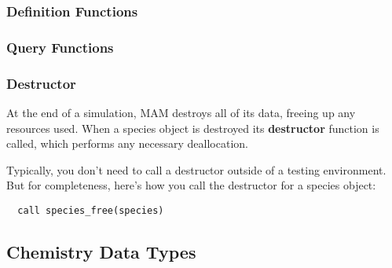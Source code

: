 \subsubsection*{Definition Functions}

\subsubsection*{Query Functions}

\subsubsection*{Destructor}

At the end of a simulation, MAM destroys all of its data, freeing up any
resources used. When a species object is destroyed its {\bf destructor }
function is called, which performs any necessary deallocation.

Typically, you don't need to call a destructor outside of a testing environment.
But for completeness, here's how you call the destructor for a species object:

\begin{verbatim}
  call species_free(species)
\end{verbatim}

\subsection{Chemistry Data Types}

